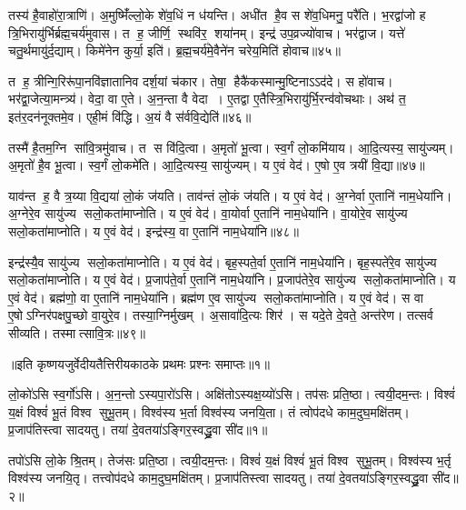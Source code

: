    तस्य॑ है॒वाहो॑रा॒त्राणि॑।
   अ॒मुष्मिँ॑ल्लो॒के शे॑व॒धिं न ध॑यन्ति।
   अधी॑त है॒व स शे॑व॒धिमनु॒ परै॑ति।
   भ॒रद्वा॑जो ह त्रि॒भिरायु॑र्भिर्ब्रह्म॒चर्य॑मुवास।
   त ह॒ जीर्णि॒ स्थवि॑र॒ शया॑नम्।
   इन्द्र॑ उप॒व्रज्यो॑वाच।
   भर॑द्वाज।
   यत्ते॑ चतु॒र्थमायु॑र्द॒द्याम्।
   किमे॑नेन कुर्या॒ इति॑।
   ब्र॒ह्म॒चर्य॑मे॒वैने॑न चरेय॒मिति॑ होवाच॥४५॥

   त ह॒ त्रीन्गि॒रिरू॑पा॒नवि॑ज्ञातानिव दर्\mbox{}श॒यां च॑कार।
   तेषा॒ हैकै॑कस्मान्मु॒ष्टिनाऽऽद॑दे।
   स हो॑वाच।
   भर॑द्वा॒जेत्या॒मन्त्र्य॑।
   वेदा॒ वा ए॒ते।
   अ॒न॒न्ता वै वेदा।
   ए॒तद्वा ए॒तैस्त्रि॒भिरायु॑र्भि॒रन्व॑\-वोचथाः।
   अथ॑ त॒ इत॑र॒दन॑नूक्तमे॒व।
   एही॒मं वि॑द्धि।
   अ॒यं वै स॑र्ववि॒द्येति॑॥४६॥

   तस्मै॑ है॒तम॒ग्नि सा॑वि॒त्रमु॑वाच।
   त स वि॑दि॒त्वा।
   अ॒मृतो॑ भू॒त्वा।
   स्व॒र्गं लो॒कमि॑याय।
   आ॒दि॒त्यस्य॒ सायु॑ज्यम्।
   अ॒मृतो॑ है॒व भू॒त्वा।
   स्व॒र्गं लो॒कमे॑ति।
   आ॒दि॒त्यस्य॒ सायु॑ज्यम्।
   य ए॒वं वेद॑।
   ए॒षो ए॒व त्रयी॑ वि॒द्या॥४७॥

   याव॑न्त ह॒ वै त्र॒य्या वि॒द्यया॑ लो॒कं ज॑यति।
   ताव॑न्तं लो॒कं ज॑यति।
   य ए॒वं वेद॑।
   अ॒ग्नेर्वा ए॒तानि॑ नाम॒धेया॑नि।
   अ॒ग्नेरे॒व सायु॑ज्य सलो॒कता॑माप्नोति।
   य ए॒वं वेद॑।
   वा॒योर्वा ए॒तानि॑ नाम॒धेया॑नि।
   वा॒योरे॒व सायु॑ज्य सलो॒कता॑माप्नोति।
   य ए॒वं वेद॑।
   इन्द्र॑स्य॒ वा ए॒तानि॑ नाम॒धेया॑नि॥४८॥

   इन्द्र॑स्यै॒व सायु॑ज्य सलो॒कता॑माप्नोति।
   य ए॒वं वेद॑।
   बृह॒स्पते॒र्वा ए॒तानि॑ नाम॒धेया॑नि।
   बृह॒स्पते॑रे॒व सायु॑ज्य सलो॒कता॑माप्नोति।
   य ए॒वं वेद॑।
   प्र॒जाप॑ते॒र्वा ए॒तानि॑ नाम॒धेया॑नि।
   प्र॒जाप॑तेरे॒व सायु॑ज्य सलो॒कता॑माप्नोति।
   य ए॒वं वेद॑।
   ब्रह्म॑णो॒ वा ए॒तानि॑ नाम॒धेया॑नि।
   ब्रह्म॑ण ए॒व सायु॑ज्य सलो॒कता॑माप्नोति।
   य ए॒वं वेद॑।
   स वा ए॒षोऽग्निर॑पक्षपु॒च्छो वा॒युरे॒व।
   तस्या॒ग्निर्मुखम्।
   अ॒सावा॑दि॒त्यः शिर॑।
   स यदे॒ते दे॒वते॒ अन्त॑रेण।
   तत्सर्व सीव्यति।
   तस्मात्सावि॒त्रः॥४९॥
   \anuvakamend
   
॥इति कृष्णयजुर्वेदीयतैत्तिरीयकाठके प्रथमः प्रश्नः समाप्तः॥१॥

\setcounter{anuvakam}{0}

   लो॒को॑ऽसि स्व॒र्गो॑ऽसि।
   अ॒न॒न्तोऽस्यपा॒रो॑ऽसि।
   अक्षि॑तो\-ऽस्यक्ष॒य्यो॑\-ऽसि।
   तप॑सः प्रति॒ष्ठा।
   त्वयी॒दम॒न्तः।
   विश्वं॑ य॒क्षं विश्वं॑ भू॒तं विश्व सुभू॒तम्।
   विश्व॑स्य भ॒र्ता विश्व॑स्य जनयि॒ता।
   तं त्वोप॑दधे काम॒दुघ॒मक्षि॑तम्।
   प्र॒जाप॑तिस्त्वा सादयतु।
   तया॑ दे॒वतया॑ऽङ्गिर॒स्वद्ध्रु॒वा सी॑द॥१॥

   तपो॑ऽसि लो॒के श्रि॒तम्।
   तेज॑सः प्रति॒ष्ठा।
   त्वयी॒दम॒न्तः।
   विश्वं॑ य॒क्षं विश्वं॑ भू॒तं विश्व सुभू॒तम्।
   विश्व॑स्य भ॒र्तृ विश्व॑स्य जनयि॒तृ।
   तत्त्वोप॑दधे काम॒दुघ॒मक्षि॑तम्।
   प्र॒जाप॑तिस्त्वा सादयतु।
   तया॑ दे॒वतया॑ऽङ्गिर॒स्वद्ध्रु॒वा सी॑द॥२॥

